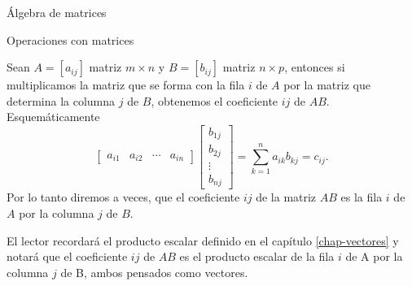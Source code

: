 \begin{chapter}{\'Algebra de matrices}
\begin{section}{Operaciones con matrices}
                \begin{obs}\label{mtrx-filasxcols}
                     Sean $A=[a_{ij}]$ matriz $m \times n$ y $B=[b_{ij}]$ matriz $n \times p$, entonces si 
                     multiplicamos la matriz que se forma con la fila $i$ de $A$ por la matriz que determina la columna $j$ de $B$, obtenemos el coeficiente $ij$ de $AB$.
                    Esquemáticamente
                    \begin{equation*}
                    \begin{bmatrix} a_{i1}& a_{i2}& \cdots &a_{in}\end{bmatrix}
                    \begin{bmatrix} b_{1j}\\ b_{2j}\\ \vdots \\b_{nj}\end{bmatrix} =  \sum_{k=1}^{n}a_{ik}b_{kj} = c_{ij}.
                    \end{equation*}
                    Por lo tanto diremos a veces, que el coeficiente $ij$ de la matriz $AB$ es la fila $i$ de $A$ por la columna $j$ de $B$. 
                    
                    El lector recordará el producto escalar definido en  el capítulo \ref{chap-vectores} y notará que el coeficiente $ij$ de $AB$ es el producto escalar de la fila $i$ de A por la columna $j$ de B, ambos pensados como vectores. 
                \end{obs}    
                

\end{section}
\end{chapter}
